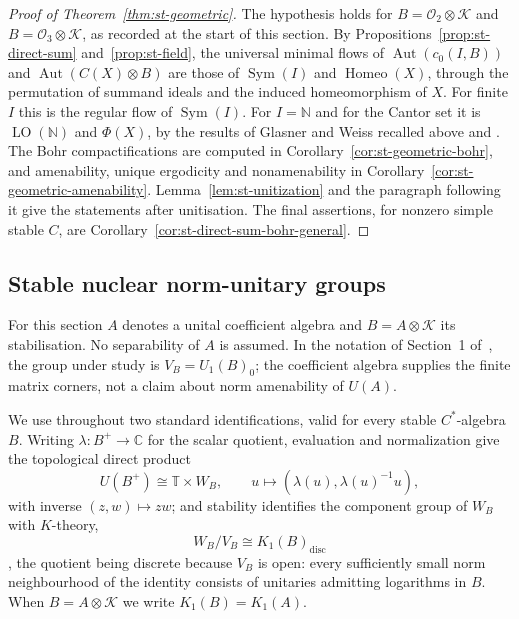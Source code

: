 \begin{proof}[Proof of Theorem~\ref{thm:st-geometric}]
The hypothesis holds for
$B=\mathcal{O}_2\otimes\mathcal{K}$ and $B=\mathcal{O}_3\otimes\mathcal{K}$, as recorded at the
start of this section. By Propositions~\ref{prop:st-direct-sum} and~\ref{prop:st-field}, the
universal minimal flows of $\operatorname{Aut}(c_0(I,B))$ and $\operatorname{Aut}(C(X)\otimes B)$ are those of
$\operatorname{Sym}(I)$ and $\operatorname{Homeo}(X)$, through the permutation of summand ideals and the
induced homeomorphism of $X$. For finite $I$ this is the regular flow of
$\operatorname{Sym}(I)$. For $I=\mathbb{N}$ and for the Cantor set it is $\operatorname{LO}(\mathbb{N})$ and
$\Phi(X)$, by the results of Glasner and Weiss recalled above
\cite{GlasnerWeiss2002,Glasner2002Orders} and \cite[Theorem~6.1]{GlasnerWeiss2003}.
The Bohr compactifications are computed in Corollary~\ref{cor:st-geometric-bohr}, and
amenability, unique ergodicity and nonamenability in
Corollary~\ref{cor:st-geometric-amenability}. Lemma~\ref{lem:st-unitization} and the paragraph
following it give the statements after unitisation. The final assertions, for
nonzero simple stable $C$, are Corollary~\ref{cor:st-direct-sum-bohr-general}.
\end{proof}


\subsection{Stable nuclear norm-unitary groups}\label{sec:st-unitaries}

For this section \(A\) denotes a unital coefficient algebra and
\(B=A\otimes\mathcal K\) its stabilisation. No separability of \(A\) is
assumed. In the notation of Section~1 of~\cite{LupiniStable2026}, the group under
study is \(V_B=U_1(B)_0\); the coefficient
algebra supplies the finite matrix corners, not a claim about norm
amenability of \(U(A)\).

We use throughout two standard identifications, valid for every stable
$C^*$-algebra $B$. Writing $\lambda:B^+\to\mathbb C$ for the scalar quotient,
evaluation and normalization give the topological direct product
\begin{equation}  \label{eq:st-scalar-splitting}
 U(B^+)\cong\mathbb T\times W_B,\qquad
 u\longmapsto(\lambda(u),\lambda(u)^{-1}u),
\end{equation}
with inverse $(z,w)\mapsto zw$; and stability identifies the component
group of $W_B$ with $K$-theory,
\begin{equation}  \label{eq:st-component-identification}
 W_B/V_B\cong K_1(B)_{\mathrm{disc}}
\end{equation}
\cite[Section~8.1]{Blackadar1998}, the quotient being discrete because $V_B$
is open: every sufficiently small norm neighbourhood of the identity
consists of unitaries admitting logarithms in $B$. When $B=A\otimes\mathcal K$ we
write $K_1(B)=K_1(A)$.

